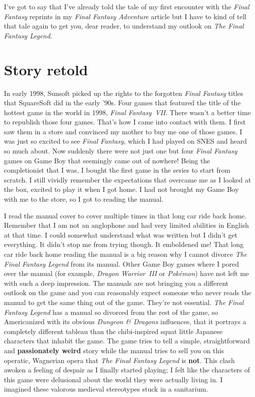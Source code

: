 \documentclass{book}
\begin{document}
I’ve got to say that I’ve already told the tale of my first encounter with the \emph{Final Fantasy} reprints in my \emph{Final Fantasy Adventure} article but I have to kind of tell that tale again to get you, dear reader, to understand my outlook on \emph{The Final Fantasy Legend}.

\FloatBarrier\needspace{5pt}\section*{Story retold}\nopagebreak[4]

In early 1998, Sunsoft picked up the rights to the forgotten \emph{Final Fantasy} titles that SquareSoft did in the early ’90s. Four games that featured the title of the hottest game in the world in 1998, \emph{Final Fantasy VII}. There wasn’t a better time to republish those four games. That’s how I came into contact with them. I first saw them in a store and convinced my mother to buy me one of those games. I was just so excited to see \emph{Final Fantasy}, which I had played on SNES and heard so much about. Now suddenly there were not just one but four \emph{Final Fantasy} games on Game Boy that seemingly came out of nowhere! Being the completionist that I was, I bought the first game in the series to start from scratch. I still vividly remember the expectations that overcame me as I looked at the box, excited to play it when I got home. I had not brought my Game Boy with me to the store, so I got to reading the manual.

I read the manual cover to cover multiple times in that long car ride back home. Remember that I am not an anglophone and had very limited abilities in English at that time. I could somewhat understand what was written but I didn’t get everything. It didn’t stop me from trying though. It emboldened me! That long car ride back home reading the manual is a big reason why I cannot divorce \emph{The Final Fantasy Legend} from its manual. Other Game Boy games where I pored over the manual (for example, \emph{Dragon Warrior III} or \emph{Pokémon}) have not left me with such a deep impression. The manuals are not bringing you a different outlook on the game and you can reasonably expect someone who never reads the manual to get the same thing out of the game. They’re not essential. \emph{The Final Fantasy Legend} has a manual so divorced from the rest of the game, so Americanized with its obvious \emph{Dungeon \& Dragons} influences, that it portrays a completely different tableau than the chibi-inspired squat little Japanese characters that inhabit the game. The game tries to tell a simple, straightforward and \textbf{passionately weird} story while the manual tries to sell you on this operatic, Wagnerian opera that \emph{The Final Fantasy Legend} is \textbf{not}. This clash awoken a feeling of despair as I finally started playing; I felt like the characters of this game were delusional about the world they were actually living in. I imagined these valorous medieval stereotypes stuck in a sanitarium.
\end{document}
